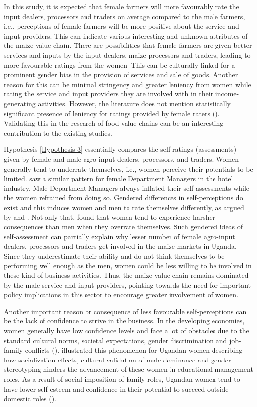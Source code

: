 \documentclass[12pt,english]{article}\usepackage[]{graphicx}\usepackage[]{color}
\begin{document}
\begin{onehalfspace}
In this study, it is expected that female farmers will more favourably
rate the input dealers, processors and traders on average compared
to the male farmers, i.e., perceptions of female farmers will be more
positive about the service and input providers. This can indicate
various interesting and unknown attributes of the maize value chain.
There are possibilities that female farmers are given better services
and inputs by the input dealers, maize processors and traders, leading
to more favourable ratings from the women. This can be culturally
linked for a prominent gender bias in the provision of services and
sale of goods. Another reason for this can be minimal stringency and
greater leniency from women while rating the service and input providers
they are involved with in their income-generating activities. However,
the literature does not mention statistically significant presence
of leniency for ratings provided by female raters (\citealp{ThorntonIII2019}).
Validating this in the research of food value chains can be an interesting
contribution to the existing studies. 

Hypothesis \ref{Hypothesis 3} essentially compares the self-ratings
(assessments) given by female and male agro-input dealers, processors,
and traders. Women generally tend to underrate themselves, i.e., women
perceive their potentials to be limited. \citet{Patiar2008} saw a
similar pattern for female Department Managers in the hotel industry.
Male Department Managers always inflated their self-assessments while
the women refrained from doing so. Gendered differences in self-perceptions
do exist and this induces women and men to rate themselves differently,
as argued by \citet{Beyer1990,WOHLERS1989} and \citet{rosenkrantz1968}.
Not only that, \citet{Braddy2020} found that women tend to experience
harsher consequences than men when they overrate themselves. Such
gendered ideas of self-assessment can partially explain why lesser
number of female agro-input dealers, processors and traders get involved
in the maize markets in Uganda. Since they underestimate their ability
and do not think themselves to be performing well enough as the men,
women could be less willing to be involved in these kind of business
activities. Thus, the maize value chain remains dominated by the male
service and input providers, pointing towards the need for important
policy implications in this sector to encourage greater involvement
of women.

Another important reason or consequence of less favourable self-perceptions
can be the lack of confidence to strive in the business. In the developing
economies, women generally have low confidence levels and face a lot
of obstacles due to the standard cultural norms, societal expectations,
gender discrimination and job-family conflicts (\citealp{Izhar2006}).
\citet{brown1996} illustrated this phenomenon for Ugandan women describing
how socialization effects, cultural validation of male dominance and
gender stereotyping hinders the advancement of these women in educational
management roles. As a result of social imposition of family roles,
Ugandan women tend to have lower self-esteem and confidence in their
potential to succeed outside domestic roles (\citealp{Izhar2006,brown1996}). 


\end{onehalfspace}
\end{document}
